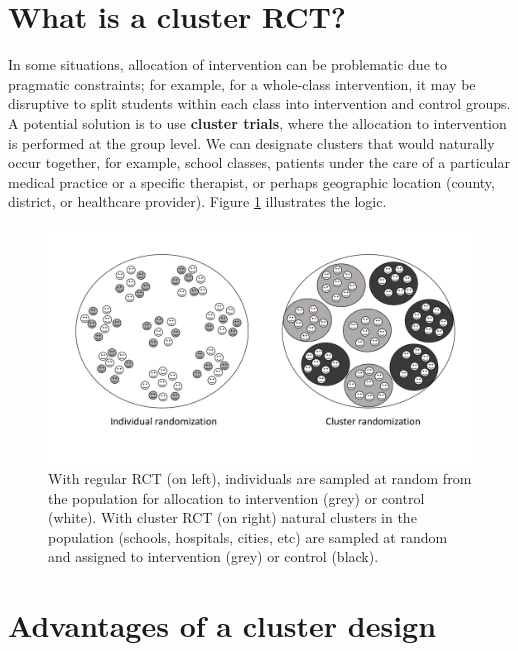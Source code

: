 \documentclass{krantz}
\begin{document}
\hypertarget{what-is-a-cluster-rct}{%
\section{What is a cluster RCT?}\label{what-is-a-cluster-rct}}

In some situations, allocation of intervention can be problematic due to pragmatic constraints; for example, for a whole-class intervention, it may be disruptive to split students within each class into intervention and control groups. A potential solution is to use \textbf{cluster trials}, where the allocation to intervention is performed at the group level. We can designate clusters that would naturally occur together, for example, school classes, patients under the care of a particular medical practice or a specific therapist, or perhaps geographic location (county, district, or healthcare provider). Figure \ref{fig:cluster-diag} illustrates the logic.\\

\begin{center}
\begin{figure}
\includegraphics[width=0.8\linewidth]{images_bw/clusterdemo} \caption{With regular RCT (on left), individuals are sampled at random from the population for allocation to intervention (grey) or control (white).  With cluster RCT (on right) natural clusters in the population (schools, hospitals, cities, etc) are sampled at random and assigned to intervention (grey) or control (black).}\label{fig:cluster-diag}
\end{figure}
\end{center}

\hypertarget{advantages-of-a-cluster-design}{%
\section{Advantages of a cluster design}\label{advantages-of-a-cluster-design}}
\end{document}

